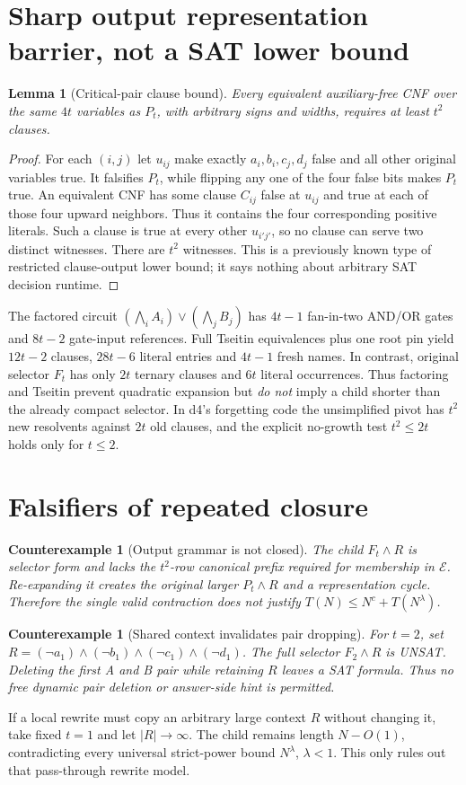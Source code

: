 \documentclass[11pt]{article}
\newtheorem{lemma}[theorem]{Lemma}
\newtheorem{counterexample}[theorem]{Counterexample}
\begin{document}
\section{Sharp output representation barrier, not a SAT lower bound}
\begin{lemma}[Critical-pair clause bound]
Every equivalent auxiliary-free CNF over the same $4t$
variables as $P_t$, with arbitrary signs and widths, requires
at least $t^2$ clauses.
\end{lemma}
\begin{proof}
For each $(i,j)$ let $u_{ij}$ make exactly
$a_i,b_i,c_j,d_j$ false and all other original variables true.
It falsifies $P_t$, while flipping any one of the four false
bits makes $P_t$ true. An equivalent CNF has some clause
$C_{ij}$ false at $u_{ij}$ and true at each of those four
upward neighbors. Thus it contains the four corresponding
positive literals. Such a clause is true at every other
$u_{i'j'}$, so no clause can serve two distinct witnesses.
There are $t^2$ witnesses. This is a previously known type
of restricted clause-output lower bound; it says nothing
about arbitrary SAT decision runtime.
\end{proof}
The factored circuit
$(\bigwedge_i A_i)\vee(\bigwedge_j B_j)$
has $4t-1$ fan-in-two AND/OR gates and $8t-2$
gate-input references. Full Tseitin equivalences plus
one root pin yield $12t-2$ clauses, $28t-6$
literal entries and $4t-1$ fresh names. In contrast, original
selector $F_t$ has only $2t$ ternary clauses and $6t$
literal occurrences. Thus factoring and Tseitin prevent
quadratic expansion but \emph{do not} imply a child shorter
than the already compact selector. In d4's forgetting code
the unsimplified pivot has $t^2$ new resolvents against
$2t$ old clauses, and the explicit no-growth test
$t^2\le2t$ holds only for $t\le2$.

\section{Falsifiers of repeated closure}
\begin{counterexample}[Output grammar is not closed]
The child $F_t\wedge R$ is selector form and lacks the
$t^2$-row canonical prefix required for membership in
$\mathcal E$. Re-expanding it creates the original larger
$P_t\wedge R$ and a representation cycle. Therefore the
single valid contraction does \emph{not} justify
$T(N)\le N^c+T(N^\lambda)$.
\end{counterexample}
\begin{counterexample}[Shared context invalidates pair dropping]
For $t=2$, set
$R=(\neg a_1)\wedge(\neg b_1)\wedge
(\neg c_1)\wedge(\neg d_1)$.
The full selector $F_2\wedge R$ is UNSAT.
Deleting the first A and B pair while retaining $R$
leaves a SAT formula. Thus no free dynamic pair deletion
or answer-side hint is permitted.
\end{counterexample}
If a local rewrite must copy an arbitrary large context $R$
without changing it, take fixed $t=1$ and let $|R|\to\infty$.
The child remains length $N-O(1)$, contradicting every
universal strict-power bound $N^\lambda$, $\lambda<1$.
This only rules out that pass-through rewrite model.
\end{document}
